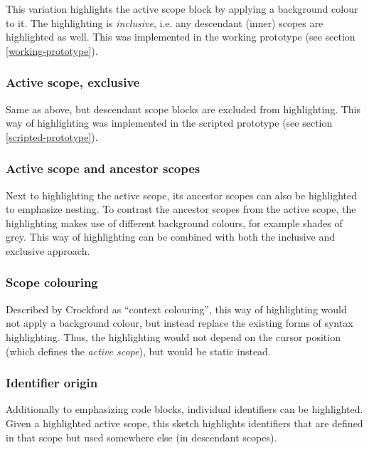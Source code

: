 This variation highlights the active scope block by applying a
background colour to it. The highlighting is \emph{inclusive}, i.e. any
descendant (inner) scopes are highlighted as well. This was implemented
in the working prototype (see section \ref{working-prototype}).

\subsubsection{Active scope, exclusive}\label{active-scope-exclusive}

Same as above, but descendant scope blocks are excluded from
highlighting. This way of highlighting was implemented in the scripted
prototype (see section \ref{scripted-prototype}).

\subsubsection{Active scope and ancestor
scopes}\label{active-scope-and-ancestor-scopes}

Next to highlighting the active scope, its ancestor scopes can also be
highlighted to emphasize nesting. To contrast the ancestor scopes from
the active scope, the highlighting makes use of different background
colours, for example shades of grey. This way of highlighting can be
combined with both the inclusive and exclusive approach.

\subsubsection{Scope colouring}\label{scope-colouring}

Described by Crockford \citeyear{crockford} as “context colouring”, this
way of highlighting would not apply a background colour, but instead
replace the existing forms of syntax highlighting. Thus, the
highlighting would not depend on the cursor position (which defines the
\emph{active scope}), but would be static instead.

\subsubsection{Identifier origin}\label{identifier-origin}

Additionally to emphasizing code blocks, individual identifiers can be
highlighted. Given a highlighted active scope, this sketch highlights
identifiers that are defined in that scope but used somewhere else (in
descendant scopes).

